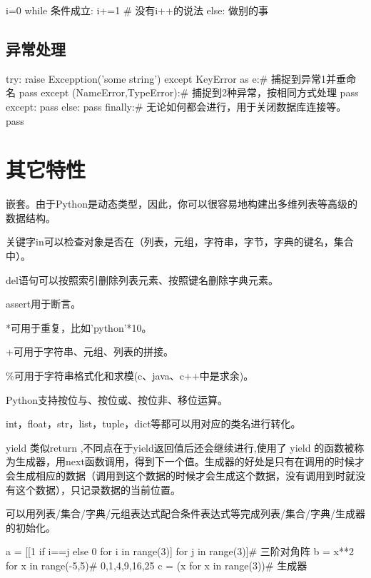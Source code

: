 \documentclass[11pt,UTF8,oneside]{mybook}
\begin{document}
\begin{python}
  i=0
  while 条件成立:
      i+=1 # 没有i++的说法
  else:
      做别的事
\end{python}


\subsection{异常处理}
\label{sec:exception}

\begin{python}
  try:
      raise Excepption('some string')
  except KeyError as e:# 捕捉到异常1并垂命名
      pass
  except (NameError,TypeError):# 捕捉到2种异常，按相同方式处理
      pass
  except:
      pass
  else:
      pass
  finally:# 无论如何都会进行，用于关闭数据库连接等。
      pass
\end{python}
\section{其它特性}
\label{sec:other_features}

嵌套。由于Python是动态类型，因此，你可以很容易地构建出多维列表等高级的
数据结构。

关键字in可以检查对象是否在（列表，元组，字符串，字节，字典的键名，集合
中）。

del语句可以按照索引删除列表元素、按照键名删除字典元素。

assert用于断言。

*可用于重复，比如'python'*10。

+可用于字符串、元组、列表的拼接。

\%可用于字符串格式化和求模(c、java、c++中是求余)。

Python支持按位与、按位或、按位非、移位运算。

int，float，str，list，tuple，dict等都可以用对应的类名进行转化。

yield 类似return ,不同点在于yield返回值后还会继续进行,使用了 yield 的函数被称为生成器，用next函数调用，得到下一个值。生成器的好处是只有在调用的时候才会生成相应的数据（调用到这个数据的时候才会生成这个数据，没有调用到时就没有这个数据），只记录数据的当前位置。

可以用列表/集合/字典/元组表达式配合条件表达式等完成列表/集合/字典/生成器的初始化。

\begin{python}
  a = [[1 if i==j else 0 for i in range(3)] for j in range(3)]# 三阶对角阵
  b = {x**2 for x in range(-5,5)}# {0,1,4,9,16,25}
  c = (x for x in range(3))# 生成器
\end{python}
\end{document}
